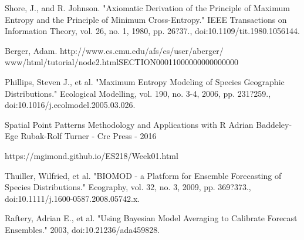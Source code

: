 \noindent [10]  Shore, J., and R. Johnson. 
"Axiomatic Derivation of the Principle of Maximum Entropy and the Principle of Minimum Cross-Entropy." 
IEEE Transactions on Information Theory, vol. 26, no. 1, 1980, pp. 26?37.,
doi:10.1109/tit.1980.1056144. \newline

\noindent [11] Berger, Adam. \newline http://www.cs.cmu.edu/afs/cs/user/aberger/\newline
www/html/tutorial/node2.htmlSECTION00011000000000000000 \newline

\noindent [12] Phillips, Steven J., et al. 
"Maximum Entropy Modeling of Species Geographic Distributions."
Ecological Modelling, vol. 190, no. 3-4, 2006, pp. 231?259.,\newline
doi:10.1016/j.ecolmodel.2005.03.026. \newline

\noindent[13] Spatial Point Patterns Methodology and Applications with R
Adrian Baddeley-Ege Rubak-Rolf Turner - Crc Press - 2016 \newline

\noindent [14] https://mgimond.github.io/ES218/Week01.html \newline

\noindent [15] Thuiller, Wilfried, et al. "BIOMOD - a Platform for Ensemble Forecasting 
of Species Distributions." Ecography, vol. 32, no. 3, 2009, pp. 369?373.,
doi:10.1111/j.1600-0587.2008.05742.x. \newline
 
 \noindent [16] Raftery, Adrian E., et al. 
"Using Bayesian Model Averaging to Calibrate Forecast Ensembles." 2003,
 doi:10.21236/ada459828.
 
 
 
 